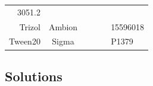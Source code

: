 \documentclass[11pt,singlespacinge,twoside]{reedthesis} %
\begin{document}
\begin{longtable}[]{@{}rccccl@{}}
\begin{minipage}[t]{0.14\columnwidth}
3051.2\strut
\end{minipage}\tabularnewline
\begin{minipage}[t]{0.19\columnwidth}\raggedleft
Trizol\strut
\end{minipage} & \begin{minipage}[t]{0.15\columnwidth}\centering
Ambion\strut
\end{minipage} & \begin{minipage}[t]{0.12\columnwidth}\centering
\strut
\end{minipage} & \begin{minipage}[t]{0.12\columnwidth}\centering
\strut
\end{minipage} & \begin{minipage}[t]{0.12\columnwidth}\centering
\strut
\end{minipage} & \begin{minipage}[t]{0.14\columnwidth}\raggedright
15596018\strut
\end{minipage}\tabularnewline
\begin{minipage}[t]{0.19\columnwidth}\raggedleft
Tween20\strut
\end{minipage} & \begin{minipage}[t]{0.15\columnwidth}\centering
Sigma\strut
\end{minipage} & \begin{minipage}[t]{0.12\columnwidth}\centering
\strut
\end{minipage} & \begin{minipage}[t]{0.12\columnwidth}\centering
\strut
\end{minipage} & \begin{minipage}[t]{0.12\columnwidth}\centering
\strut
\end{minipage} & \begin{minipage}[t]{0.14\columnwidth}\raggedright
P1379\strut
\end{minipage}\tabularnewline
\bottomrule
\end{longtable}
\hypertarget{mat-sol}{%
\subsection{Solutions}\label{mat-sol}}
\end{document}
